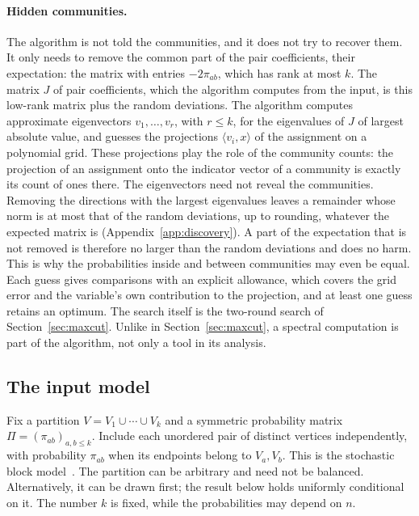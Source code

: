\documentclass[11pt,a4paper]{article}
\theoremstyle{definition}
\theoremstyle{remark}
\begin{document}
\paragraph{Hidden communities.}
The algorithm is not told the communities, and it does not try to recover
them. It only needs to remove the common part of the pair coefficients,
their expectation: the matrix with entries $-2\pi_{ab}$, which has rank at
most $k$. The matrix $J$ of pair coefficients, which the algorithm computes
from the input, is this low-rank matrix plus the random deviations. The
algorithm computes approximate eigenvectors $v_1,\ldots,v_r$, with
$r\le k$, for the eigenvalues of $J$ of largest absolute value, and guesses
the projections $\langle v_i,x\rangle$ of the assignment on a polynomial
grid. These projections play the role of the community counts: the
projection of an assignment onto the indicator vector of a community is
exactly its count of ones there. The eigenvectors need not reveal the
communities. Removing the directions with the largest eigenvalues leaves a
remainder whose norm is at most that of the random deviations, up to
rounding, whatever the expected matrix is (Appendix~\ref{app:discovery}).
A part of the expectation that is not removed is therefore no larger than
the random deviations and does no harm. This is why the probabilities
inside and between communities may even be equal. Each guess gives
comparisons with an explicit allowance, which covers the grid error and
the variable's own contribution to the projection, and at least one guess
retains an optimum. The search itself is the two-round search of
Section~\ref{sec:maxcut}. Unlike in Section~\ref{sec:maxcut}, a spectral
computation is part of the algorithm, not only a tool in its analysis.

\subsection{The input model}\label{sec:sbm_model}

Fix a partition $V=V_1\cup\cdots\cup V_k$ and a symmetric probability
matrix $\Pi=(\pi_{ab})_{a,b\le k}$. Include each unordered pair of distinct
vertices independently, with probability $\pi_{ab}$ when its endpoints
belong to $V_a,V_b$. This is the stochastic block model~\cite{Abbe18}.
The partition can be arbitrary and need not be balanced. Alternatively,
it can be drawn first; the result below holds uniformly conditional on it.
The number $k$ is fixed, while the probabilities may depend on $n$.
\end{document}
